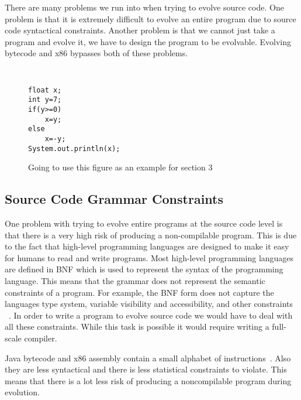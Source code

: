 \documentclass{sig-alternate}
\begin{document}
There are many problems we run into when trying to evolve source code. One problem is that it is extremely difficult to evolve an entire program due to source code syntactical constraints. Another problem is that we cannot just take a program and evolve it, we have to design the program to be evolvable. Evolving bytecode and x86 bypasses both of these problems.

\begin{figure}
\centering
{\tt
\begin{verbatim}
float x; 
int y=7;
if(y>=0)
    x=y;
else
    x=-y;
System.out.println(x);

\end{verbatim}
}
\caption{Going to use this figure as an example for section 3}
\end{figure}

\subsection{Source Code Grammar Constraints}
One problem with trying to evolve entire programs at the source code level is that there is a very high risk of producing a non-compilable program. This is due to the fact that high-level programming languages are designed to make it easy for humans to read and write programs. Most high-level programming languages are defined in BNF which is used to represent the syntax of the programming language. This means that the grammar does not represent the semantic constraints of a program. For example, the BNF form does not capture the languages type system, variable visibility and accessibility, and other constraints ~\cite{FINCH:2011}. In order to write a program to evolve source code we would have to deal with all these constraints. While this task is possible it would require writing a full-scale compiler. \par

Java bytecode and x86 assembly contain a small alphabet of instructions~\cite{Assembly:2010}. Also they are less syntactical and there is less statistical constraints to violate. This means that there is a lot less risk of producing a noncompilable program during evolution. 
\end{document}
